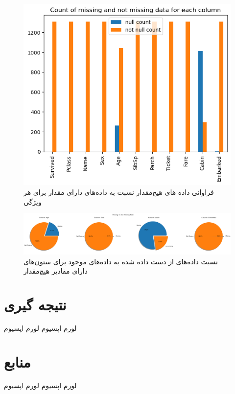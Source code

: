 \documentclass{article}
\begin{document}
	
	
	\begin{figure}[!h]
		\centering
		\includegraphics[scale=0.65]{./figs/Count-of-missing-and-not-missing data-for-each-column}
		\caption{
			فراوانی داده های هیج‌مقدار نسبت به داده‌های دارای مقدار برای هر ویژگی
		}
		\label{fig: nullHist}
	\end{figure}
	\begin{figure}[!h]
		\centering
		\includegraphics[scale=0.3]{./figs/Missing vs Not Missing Rate}
		\caption{
			نسبت داده‌های از دست داده شده به داده‌های موجود برای ستون‌های دارای مقادیر هیچ‌مقدار
		}
		\label{fig: nullpies}
	\end{figure}
	
	
	\section*{نتیجه گیری}
	لورم اپسیوم
	لورم اپسیوم
	\section*{منابع}
	لورم اپسیوم
	لورم اپسیوم
	
\end{document}
